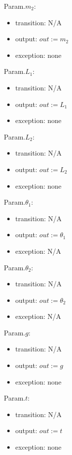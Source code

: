 \documentclass[12pt, titlepage]{article}
\begin{document}
\noindent Param.$m_2$:
\begin{itemize}
\item transition: N/A
\item output: $out := m_2$
\item exception: none
\end{itemize}

\noindent Param.$L_1$:
\begin{itemize}
\item transition: N/A
\item output: $out := L_1$
\item exception: none
\end{itemize}

\noindent Param.$L_2$:
\begin{itemize}
\item transition: N/A
\item output: $out := L_2$
\item exception: none
\end{itemize}

\noindent Param.$\theta_1$:
\begin{itemize}
\item transition: N/A
\item output: $out := \theta_1$
\item exception: N/A
\end{itemize}

\noindent Param.$\theta_2$:
\begin{itemize}
\item transition: N/A
\item output: $out := \theta_2$
\item exception: N/A
\end{itemize}


\noindent Param.$g$:
\begin{itemize}
\item transition: N/A
\item output: $out := g$
\item exception: none
\end{itemize}

\noindent Param.$t$:
\begin{itemize}
\item transition: N/A
\item output: $out := t$
\item exception: none
\end{itemize}
\end{document}
